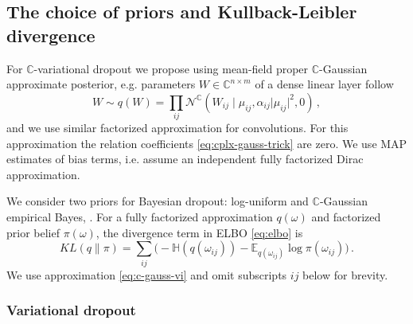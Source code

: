 \documentclass[a4paper,10pt]{article}
\newcommand{\cplx}{\mathbb{C}}
\begin{document}
\subsection{The choice of priors and Kullback-Leibler divergence} %
\label{sub:priors_and_kullback_leibler_divergence}

For $\cplx$-variational dropout we propose using mean-field proper $\cplx$-Gaussian approximate
posterior, e.g. parameters $W \in \cplx^{n\times m}$ of a dense linear layer follow
\begin{equation}  \label{eq:c-gauss-vi}
  W \sim q(W)
    = \prod_{ij} \mathcal{N}^{\cplx}(
      W_{ij} \mid
        \mu_{ij},
        \alpha_{ij} \lvert \mu_{ij} \rvert^2,
        0
    )
  \,,
\end{equation}
and we use similar factorized approximation for convolutions. For this approximation the
relation coefficients \eqref{eq:cplx-gauss-trick} are zero. We use MAP estimates of bias
terms, i.e. assume an independent fully factorized Dirac approximation.

We consider two priors for Bayesian dropout: log-uniform and $\cplx$-Gaussian empirical
Bayes, \citep{kingma_variational_2015,molchanov_variational_2017,kharitonov_variational_2018}.
For a fully factorized approximation $q(\omega)$ and factorized prior belief $\pi(\omega)$,
the divergence term in ELBO \eqref{eq:elbo} is
\begin{equation}  \label{eq:elbo-general-kl-div}
  KL(q \| \pi)
    = \sum_{ij} \bigl(
        - \mathbb{H}(q(\omega_{ij}))
        - \mathbb{E}_{q(\omega_{ij})} \log{\pi(\omega_{ij})}
      \bigr)
    \,.
\end{equation}
We use approximation \eqref{eq:c-gauss-vi} and omit subscripts ${ij}$ below for brevity.

\subsubsection{Variational dropout} %
\label{ssub:variational_dropout}
\end{document}
